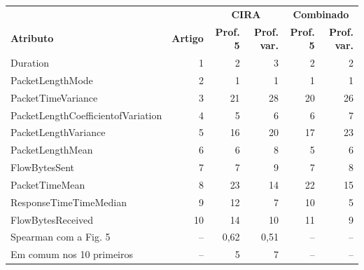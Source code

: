 \begin{tabular}{lrrrrr}
\hline
\multicolumn{2}{c}{\textbf{}} & \multicolumn{2}{c}{\textbf{CIRA}} & \multicolumn{2}{c}{\textbf{Combinado}} \\
\textbf{Atributo} & \textbf{Artigo} & \textbf{Prof. 5} & \textbf{Prof. var.} & \textbf{Prof. 5} & \textbf{Prof. var.} \\ \hline
Duration & 1 & 2 & 3 & 2 & 2 \\
PacketLengthMode & 2 & 1 & 1 & 1 & 1 \\
PacketTimeVariance & 3 & 21 & 28 & 20 & 26 \\
PacketLengthCoefficientofVariation & 4 & 5 & 6 & 6 & 7 \\
PacketLengthVariance & 5 & 16 & 20 & 17 & 23 \\
PacketLengthMean & 6 & 6 & 8 & 5 & 6 \\
FlowBytesSent & 7 & 7 & 9 & 7 & 8 \\
PacketTimeMean & 8 & 23 & 14 & 22 & 15 \\
ResponseTimeTimeMedian & 9 & 12 & 7 & 10 & 5 \\
FlowBytesReceived & 10 & 14 & 10 & 11 & 9 \\
\hline
Spearman com a Fig. 5 & -- & 0,62 & 0,51 & -- & -- \\
Em comum nos 10 primeiros & -- & 5 & 7 & -- & -- \\
\hline
\end{tabular}
